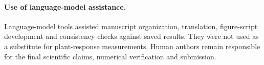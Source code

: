 \paragraph{Use of language-model assistance.}
Language-model tools assisted manuscript organization, translation, figure-script
development and consistency checks against saved results. They were not used as
a substitute for plant-response measurements. Human authors remain responsible
for the final scientific claims, numerical verification and submission.
